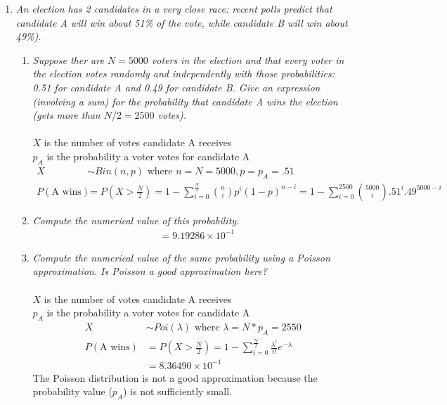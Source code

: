 \documentclass{article} %
\begin{document}
\begin{enumerate}
	\item \textit{An election has 2 candidates in a very close race: recent polls predict that candidate A will win about 51\% of the vote, while candidate B will win about 49\%).}
	\begin{enumerate}
		\item \textit{Suppose ther are $N = 5000$ voters in the election and that every voter in the election votes randomly and independently with those probabilities: 0.51 for candidate A and 0.49 for candidate B. Give an expression (involving a sum) for the probability that candidate A wins the election (gets more than $N/2 = 2500$ votes).}\\
		\\
		$X$ is the number of votes candidate A receives\\
		$p_A$ is the probability a voter votes for candidate A
		\begin{align*}
		X &\sim Bin(n, p) \text{ where } n = N = 5000, p = p_A = .51\\
		P(\text{A wins}) &= P(X > \frac{N}{2}) = 1 - \sum_{i=0}^{\frac{N}{2}}\binom{n}{i}p^i(1 - p)^{n-i} = 1 - \sum_{i=0}^{2500}\binom{5000}{i}.51^i.49^{5000-i}
		\end{align*}
		
		\item \textit{Compute the numerical value of this probability.}
		\begin{align*}
		&= 9.19286 \times 10^{-1}
		\end{align*}
		
		\item \textit{Compute the numerical value of the same probability using a Poisson approximation. Is Poisson a good approximation here?}\\
		\\
		$X$ is the number of votes candidate A receives\\
		$p_A$ is the probability a voter votes for candidate A	
		\begin{align*}
		X &\sim Poi(\lambda) \text{ where } \lambda = N * p_A = 2550\\
		P(\text{A wins}) &= P(X > \frac{N}{2}) = 1 - \sum_{i=0}^{\frac{N}{2}}\frac{\lambda^i}{i!}e^{-\lambda}\\
		&= 8.36490 \times 10^{-1}
		\end{align*}
		The Poisson distribution is not a good approximation because the probability value ($p_A$) is not sufficiently small.
	
	\end{enumerate}
	

\end{enumerate}
\end{document}
